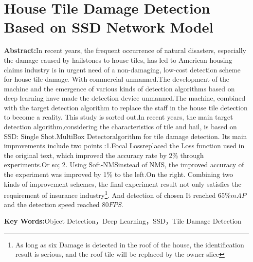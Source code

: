 \section*{House Tile Damage Detection Based on SSD Network Model}
\par \noindent
\textbf{\songti {}Abstract:}In recent years, the frequent occurrence of natural disasters, especially the damage caused by hailstones to house tiles, has led to American housing claims industry is in urgent need of a non-damaging, low-cost detection scheme for house tile damage. With commercial unmanned.The development of the machine and the emergence of various kinds of detection algorithms based on deep learning have made the detection device unmanned.The machine, combined with the target detection algorithm to replace the staff in the house tile detection to become a reality. This study is sorted out.In recent years, the main target detection algorithm,considering the characteristics of tile and hail, is based on SSD: Single Shot.MultiBox Detector\cite{ssd}algorithm for tile damage detection. Its main improvements include two points :1.Focal Loss\cite{focal-loss}replaced the Loss function used in the original text, which improved the accuracy rate by 2\% through experiments.Or so; 2. Using Soft-NMS\cite{soft-nms}instead of NMS, the improved accuracy of the experiment was improved by 1\% to the left.On the right. Combining two kinds of improvement schemes, the final experiment result not only satisfies the requirement of insurance industry\footnote{As long as six Damage is detected in the roof of the house, the identification result is serious, and the roof tile will be replaced by the owner slice}. And detection of chosen It reached $65\%mAP$ and the detection speed reached $80FPS$.

\par \noindent
\textbf{\songti {}Key Words:}{\kaishu {}Object Detection，Deep Learning，SSD，Tile Damage Detection}
